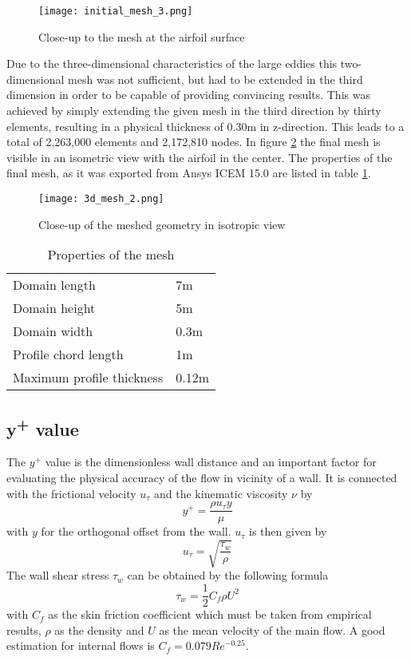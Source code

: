 \begin{figure}[ht]
\centering
\texttt{[image: initial\_mesh\_3.png]}
\caption{Close-up to the mesh at the airfoil surface}
\label{fig:mesh_closeup}
\end{figure}

Due to the three-dimensional characteristics of the large eddies this two-dimensional mesh was not sufficient, but had to be extended in the third dimension in order to be capable of providing convincing results. This was achieved by simply extending the given mesh in the third direction by thirty elements, resulting in a physical thickness of 0.30m in z-direction. This leads to a total of 2,263,000 elements and 2,172,810 nodes. In figure \ref{fig:mesh_iso} the final mesh is visible in an isometric view with the airfoil in the center. The properties of the final mesh, as it was exported from Ansys ICEM 15.0 are listed in table \ref{tab:mesh_prop}.
\begin{figure}[ht]
\centering
\texttt{[image: 3d\_mesh\_2.png]}
\caption{Close-up of the meshed geometry in isotropic view}
\label{fig:mesh_iso}
\end{figure}
\begin{table}[ht]
\centering
\caption{Properties of the mesh}
\label{tab:mesh_prop}
\begin{tabular}{ll}
Domain length&7m\\
Domain height&5m\\
Domain width&0.3m\\
Profile chord length&1m\\
Maximum profile thickness&0.12m\\
\end{tabular}
\end{table}

\subsection{y\textsuperscript{+} value}
The $y^+$ value is the dimensionless wall distance and an important factor for evaluating the physical accuracy of the flow in vicinity of a wall. It is connected with the frictional velocity $u_{\tau}$ and the kinematic viscosity $\nu$ by
\begin{equation}
\label{eq:yplus}
y^+ = \frac{\rho u_{\tau}y}{\mu}
\end{equation}
with $y$ for the orthogonal offset from the wall. $u_{\tau}$ is then given by
\begin{equation}
u_{\tau} = \sqrt{\frac{\tau_w}{\rho}}
\end{equation}
The wall shear stress $\tau_w$ can be obtained by the following formula
\begin{equation}
\tau_w = \frac{1}{2} C_f \rho U^2
\end{equation}
with $C_f$ as the skin friction coefficient which must be taken from empirical results, $\rho$ as the density and $U$ as the mean velocity of the main flow. A good estimation for internal flows is $C_f = 0.079 Re^{-0.25}$.

